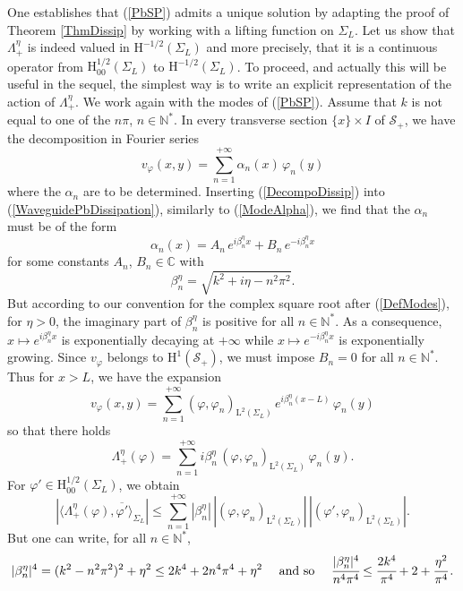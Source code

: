 \documentclass[11pt,a4paper]{report}
\newcommand{\dsp}{\displaystyle}
\newcommand{\mrm}[1]{\mathrm{#1}}
\newcommand{\Cplx}{\mathbb{C}}
\newcommand{\N}{\mathbb{N}}
\newcommand{\mL}{\mrm{L}}
\newcommand{\mH}{\mrm{H}}
\begin{document}
One establishes that (\ref{PbSP}) admits a unique solution by adapting the proof of Theorem \ref{ThmDissip} by working with a lifting function on $\Sigma_L$. Let us show that
 $\Lambda_+^\eta$ is indeed valued in $\mH^{-1/2}(\Sigma_L)$ and more precisely, that it is a continuous operator from $\mH^{1/2}_{00}(\Sigma_L)$ to $\mH^{-1/2}(\Sigma_L)$. To proceed, and actually this will be useful in the sequel, the simplest way is to write an explicit representation of the action of $\Lambda_+^\eta$. We work again with the modes of (\ref{PbSP}). Assume that $k$ is not equal to one of the $n\pi$, $n\in\N^\ast$. In every transverse section $\{x\}\times I$ of $\mathcal{S}_+$, we have the decomposition in Fourier series
\begin{equation}\label{DecompoDissip}
v_{\varphi}(x,y)=\sum_{n=1}^{+\infty} \alpha_n(x)\,\varphi_n(y)
\end{equation}
where the $\alpha_n$ are to be determined. Inserting (\ref{DecompoDissip}) into (\ref{WaveguidePbDissipation}), similarly to (\ref{ModeAlpha}), we find that the $\alpha_n$ must be of the form
\[
\alpha_n(x)=A_n\,e^{i\beta_n^\eta x}+B_n\,e^{-i\beta_n^\eta  x}
\]
for some constants $A_n$, $B_n\in\Cplx$ with 
\[
\beta_n^\eta=\sqrt{k^2+i\eta-n^2\pi^2}.
\]
But according to our convention for the complex square root after (\ref{DefModes}), for $\eta>0$, the imaginary part of $\beta_n^\eta$ is positive for all $n\in\N^\ast$. As a consequence, $x\mapsto e^{i\beta_n^\eta x}$ is exponentially decaying at $+\infty$ while $x\mapsto e^{-i\beta_n^\eta x}$ is exponentially growing. Since $v_{\varphi}$ belongs to $\mH^1(\mathcal{S}_+)$, we must impose $B_n=0$ for all $n\in\N^\ast$. Thus for $x>L$, we have the expansion
\[
v_{\varphi}(x,y)=\sum_{n=1}^{+\infty} (\varphi,\varphi_n)_{\mL^2(\Sigma_L)}\,e^{i\beta_n^\eta (x-L)}\,\varphi_n(y)
\]
so that there holds
\[
\Lambda_+^\eta(\varphi)=\dsp\sum_{n=1}^{+\infty} i\beta_n^\eta\,(\varphi,\varphi_n)_{\mL^2(\Sigma_L)}\,\varphi_n(y).
\]
For $\varphi'\in \mH^{1/2}_{00}(\Sigma_L)$, we obtain
\begin{equation}\label{EstimaDtNCont0}
|\langle \Lambda_+^\eta(\varphi),\overline{\varphi'}\rangle_{\Sigma_L}| \le \dsp\sum_{n=1}^{+\infty} |\beta_n^\eta|\,|(\varphi,\varphi_n)_{\mL^2(\Sigma_L)}|\,|(\varphi',\varphi_n)_{\mL^2(\Sigma_L)}|. 
\end{equation}
But one can write, for all $n\in\N^\ast$,
\[
|\beta_n^\eta|^4=(k^2-n^2\pi^2)^2+\eta^2 \le 2k^4+2n^4\pi^4+\eta^2\quad\mbox{ and so }\quad\cfrac{|\beta_n^\eta|^4}{n^4\pi^4}\le \cfrac{2k^4}{\pi^4} 
+2+\cfrac{\eta^2}{\pi^4}\,.
\]
\end{document}

